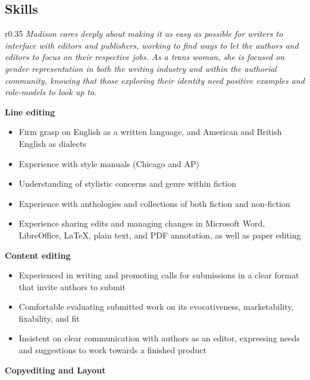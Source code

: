\subsection{Skills}

\begin{wrapfigure}{r}{0.35\linewidth}
  \textit{\color{titlegreydark} \large Madison cares deeply about making it as easy as possible for writers to interface with editors and publishers, working to find ways to let the authors and editors to focus on their respective jobs. As a trans woman, she is focused on gender representation in both the writing industry and within the authorial community, knowing that those exploring their identity need positive examples and role-models to look up to.}
  \vspace{-0.5in}
\end{wrapfigure}

\textbf{Line editing}

\begin{itemize}
  \item Firm grasp on English as a written language, and American and British English as dialects
  \item Experience with style manuals (Chicago and AP)
  \item Understanding of stylistic concerns and genre within fiction
  \item Experience with anthologies and collections of both fiction and non-fiction
  \item Experience sharing edits and managing changes in Microsoft Word, LibreOffice, \LaTeX, plain text, and PDF annotation, as well as paper editing
\end{itemize}

\hspace{-1.5em}\textbf{Content editing}

\begin{itemize}
  \item Experienced in writing and promoting calls for submissions in a clear format that invite authors to submit
  \item Comfortable evaluating submitted work on its evocativeness, marketability, fixability, and fit
  \item Insistent on clear communication with authors as an editor, expressing needs and suggestions to work towards a finished product
\end{itemize}

\hspace{-1.5em}\textbf{Copyediting and Layout}

